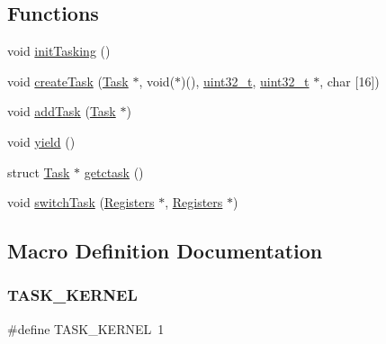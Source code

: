 \subsection*{Functions}
\begin{DoxyCompactItemize}
\item 
void \hyperlink{a00059_aea945e91746a54801f4763ad264746b9_aea945e91746a54801f4763ad264746b9}{init\+Tasking} ()
\item 
void \hyperlink{a00059_a3abb1d0cc6fd9ea5a5b860f36bc81d6a_a3abb1d0cc6fd9ea5a5b860f36bc81d6a}{create\+Task} (\hyperlink{a00151}{Task} $\ast$, void($\ast$)(), \hyperlink{a00104_a435d1572bf3f880d55459d9805097f62_a435d1572bf3f880d55459d9805097f62}{uint32\+\_\+t}, \hyperlink{a00104_a435d1572bf3f880d55459d9805097f62_a435d1572bf3f880d55459d9805097f62}{uint32\+\_\+t} $\ast$, char \mbox{[}16\mbox{]})
\item 
void \hyperlink{a00059_a077ea59d35297d9fb3fa4675beefbd79_a077ea59d35297d9fb3fa4675beefbd79}{add\+Task} (\hyperlink{a00151}{Task} $\ast$)
\item 
void \hyperlink{a00059_a58c8b2ad0ea491a6642e5e1cbd358c89_a58c8b2ad0ea491a6642e5e1cbd358c89}{yield} ()
\item 
struct \hyperlink{a00151}{Task} $\ast$ \hyperlink{a00059_a5913e9b2190b2b4118ee020721a320e2_a5913e9b2190b2b4118ee020721a320e2}{getctask} ()
\item 
void \hyperlink{a00059_a2425ca34147fccde2d1503332d21c5bd_a2425ca34147fccde2d1503332d21c5bd}{switch\+Task} (\hyperlink{a00147}{Registers} $\ast$, \hyperlink{a00147}{Registers} $\ast$)
\end{DoxyCompactItemize}


\subsection{Macro Definition Documentation}
\mbox{\label{a00059_a99096319a92bcf092a1a00a701afbfd8_a99096319a92bcf092a1a00a701afbfd8}} 
\subsubsection{\texorpdfstring{T\+A\+S\+K\+\_\+\+K\+E\+R\+N\+EL}{TASK\_KERNEL}}
{\footnotesize\ttfamily \#define T\+A\+S\+K\+\_\+\+K\+E\+R\+N\+EL~1}




